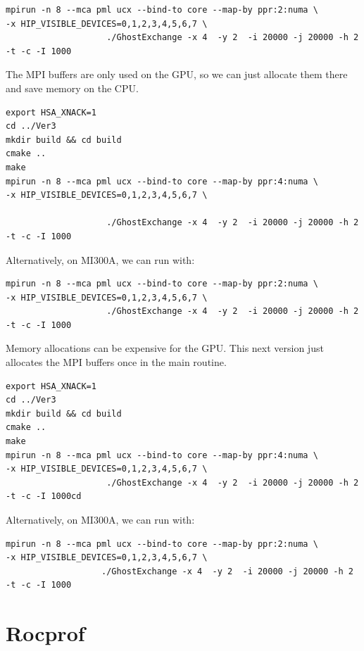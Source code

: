 \documentclass[
]{article}
\begin{document}
\begin{verbatim}
mpirun -n 8 --mca pml ucx --bind-to core --map-by ppr:2:numa \
-x HIP_VISIBLE_DEVICES=0,1,2,3,4,5,6,7 \
                    ./GhostExchange -x 4  -y 2  -i 20000 -j 20000 -h 2 -t -c -I 1000
\end{verbatim}

The MPI buffers are only used on the GPU, so we can just allocate them
there and save memory on the CPU.

\begin{verbatim}
export HSA_XNACK=1
cd ../Ver3
mkdir build && cd build
cmake ..
make
mpirun -n 8 --mca pml ucx --bind-to core --map-by ppr:4:numa \
-x HIP_VISIBLE_DEVICES=0,1,2,3,4,5,6,7 \ 

                    ./GhostExchange -x 4  -y 2  -i 20000 -j 20000 -h 2 -t -c -I 1000
\end{verbatim}

Alternatively, on MI300A, we can run with:

\begin{verbatim}
mpirun -n 8 --mca pml ucx --bind-to core --map-by ppr:2:numa \
-x HIP_VISIBLE_DEVICES=0,1,2,3,4,5,6,7 \
                    ./GhostExchange -x 4  -y 2  -i 20000 -j 20000 -h 2 -t -c -I 1000
\end{verbatim}

Memory allocations can be expensive for the GPU. This next version just
allocates the MPI buffers once in the main routine.

\begin{verbatim}
export HSA_XNACK=1
cd ../Ver3
mkdir build && cd build
cmake ..
make
mpirun -n 8 --mca pml ucx --bind-to core --map-by ppr:4:numa \
-x HIP_VISIBLE_DEVICES=0,1,2,3,4,5,6,7 \
                    ./GhostExchange -x 4  -y 2  -i 20000 -j 20000 -h 2 -t -c -I 1000cd
\end{verbatim}

Alternatively, on MI300A, we can run with:

\begin{verbatim}
mpirun -n 8 --mca pml ucx --bind-to core --map-by ppr:2:numa \
-x HIP_VISIBLE_DEVICES=0,1,2,3,4,5,6,7 \
                   ./GhostExchange -x 4  -y 2  -i 20000 -j 20000 -h 2 -t -c -I 1000
\end{verbatim}


\pagebreak

\hypertarget{rocprof}{%
\section{Rocprof}\label{rocprof}}
\end{document}
